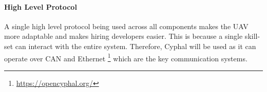 \paragraph{High Level Protocol}
A single high level protocol being used across all components makes the \gls{UAV} more adaptable and makes hiring developers easier. This is because a single skill-set can interact with the entire system. Therefore, Cyphal will be used as it can operate over \gls{CAN} and Ethernet \footnote{\url{https://opencyphal.org/}} which are the key communication systems. 

